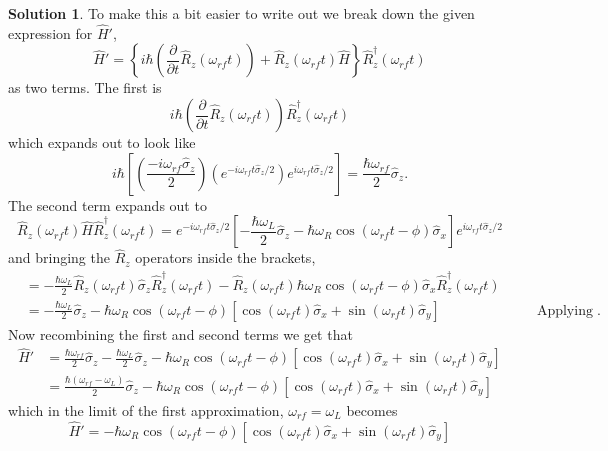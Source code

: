 \documentclass[10pt]{article}
\theoremstyle{definition}
\newtheorem{soln}{Solution}
\newcommand{\justif}[2]{&{#1}&\text{#2}}
\begin{document}
\begin{soln}
  To make this a bit easier to write out we break down the given expression for $\hat{H}'$,
  $$\hat{H}'=\left\{i\hbar\left(\frac{\partial}{\partial t}\hat{R}_z(\omega_{rf}t)\right)+\hat{R}_z(\omega_{rf}t)\hat{H}\right\}\hat{R}^\dagger_z(\omega_{rf}t)$$
  as two terms. The first is
  $$i\hbar\left(\frac{\partial}{\partial t}\hat{R}_z(\omega_{rf}t)\right)\hat{R}^\dagger_z(\omega_{rf}t)$$
  which expands out to look like
  $$i\hbar\left[\left(\frac{-i\omega_{rf}\hat{\sigma}_z}{2}\right)\left(e^{-i\omega_{rf}t\hat{\sigma}_z/2}\right)e^{i\omega_{rf}t\hat{\sigma}_z/2}\right]
    =\frac{\hbar\omega_{rf}}{2}\hat{\sigma}_z.
  $$
  The second term expands out to
  $$
    \hat{R}_z(\omega_{rf}t)\hat{H}\hat{R}^\dagger_z(\omega_{rf}t)
    =e^{-i\omega_{rf}t\hat{\sigma}_z/2}\left[-\frac{\hbar \omega_L}{2}\hat{\sigma}_z-\hbar\omega_R\cos\left(\omega_{rf}t-\phi\right)\hat{\sigma}_x\right]e^{i\omega_{rf}t\hat{\sigma}_z/2}
  $$
  and bringing the $\hat{R}_z$ operators inside the brackets,
  \begin{align*}
     & =-\frac{\hbar \omega_L}{2}\hat{R}_z(\omega_{rf}t)\hat{\sigma}_z\hat{R}^\dagger_z(\omega_{rf}t)-\hat{R}_z(\omega_{rf}t)\hbar\omega_R\cos\left(\omega_{rf}t-\phi\right)\hat{\sigma}_x\hat{R}^\dagger_z(\omega_{rf}t)   \\
     & =-\frac{\hbar \omega_L}{2}\hat{\sigma}_z-\hbar\omega_R\cos\left(\omega_{rf}t-\phi\right)\left[\cos(\omega_{rf}t)\hat{\sigma}_x+\sin(\omega_{rf}t)\hat{\sigma}_y\right]\justif{\quad}{Applying the given identities}.
  \end{align*}
  Now recombining the first and second terms we get that
  \begin{align*}
    \hat{H}' & =\frac{\hbar\omega_{rf}}{2}\hat{\sigma}_z
    -\frac{\hbar \omega_L}{2}\hat{\sigma}_z-\hbar\omega_R\cos\left(\omega_{rf}t-\phi\right)\left[\cos(\omega_{rf}t)\hat{\sigma}_x+\sin(\omega_{rf}t)\hat{\sigma}_y\right] \\
             & =\frac{\hbar\left(\omega_{rf}-\omega_L\right)}{2}\hat{\sigma}_z
    -\hbar\omega_R\cos\left(\omega_{rf}t-\phi\right)\left[\cos(\omega_{rf}t)\hat{\sigma}_x+\sin(\omega_{rf}t)\hat{\sigma}_y\right]
  \end{align*}
  which in the limit of the first approximation, $\omega_{rf}=\omega_L$ becomes
  $$
    \hat{H}'=-\hbar\omega_R\cos\left(\omega_{rf}t-\phi\right)\left[\cos(\omega_{rf}t)\hat{\sigma}_x+\sin(\omega_{rf}t)\hat{\sigma}_y\right]
  $$


\end{soln}
\end{document}
